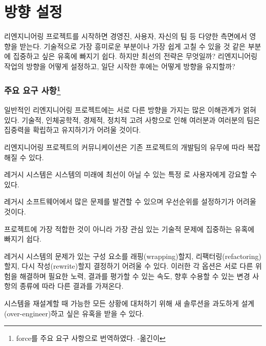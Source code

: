 \documentclass[a4paper,10pt,twoside]{book}
\begin{document}
	\renewcommand{\nnbb}[2]{} %
	\sloppy
\fi
\chapter{방향 설정}

리엔지니어링 프로젝트를 시작하면 경영진, 사용자, 자신의 팀 등 다양한 측면에서 영향을 받는다. 기술적으로 가장 흥미로운 부분이나 가장 쉽게 고칠 수 있을 것 같은 부분에 집중하고 싶은 유혹에 빠지기 쉽다. 하지만 최선의 전략은 무엇일까? 리엔지니어링 작업의 방향을 어떻게 설정하고, 일단 시작한 후에는 어떻게 방향을 유지할까?

\subsection*{주요 요구 사항\footnote{force를 주요 요구 사항으로 번역하였다. -옮긴이}}
\begin{bulletlist}
  \item 일반적인 리엔지니어링 프로젝트에는 서로 다른 방향을 가지는 많은 이해관계가 얽혀 있다. 기술적, 인체공학적, 경제적, 정치적 고려 사항으로 인해 여러분과 여러분의 팀은 집중력을 확립하고 유지하기가 어려울 것이다. 

  \item 리엔지니어링 프로젝트의 커뮤니케이션은 기존 프로젝트의 개발팀의 유무에 따라 복잡해질 수 있다.

  \item 레거시 시스템은 시스템의 미래에 최선이 아닐 수 있는 특정 로 사용자에게 강요할 수 있다.

  \item 레거시 소프트웨어에서 많은 문제를 발견할 수 있으며 우선순위를 설정하기가 어려울 것이다.

  \item 프로젝트에 가장 적합한 것이 아니라 가장 관심 있는 기술적 문제에 집중하는 유혹에 빠지기 쉽다.

  \item 레거시 시스템의 문제가 있는 구성 요소를 래핑(wrapping)할지, 리팩터링(refactoring)할지, 다시 작성(rewrite)할지 결정하기 어려울 수 있다. 이러한 각 옵션은 서로 다른 위험을 해결하며 필요한 노력, 결과를 평가할 수 있는 속도, 향후 수용할 수 있는 변경 사항의 종류에 따라 다른 결과를 가져온다.

  \item 시스템을 재설계할 때 가능한 모든 상황에 대처하기 위해 새 솔루션을 과도하게 설계(over-engineer)하고 싶은 유혹을 받을 수 있다.
\end{bulletlist}
\end{document}
